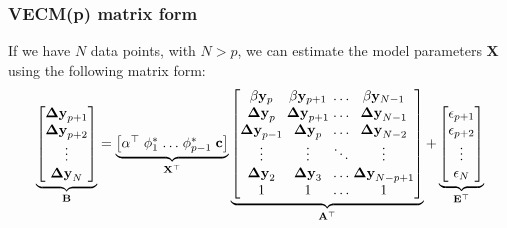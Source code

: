 \documentclass{beamer}
\begin{document}
\appendix

\begin{frame}
\frametitle{VECM(p) matrix form}
If we have $N$ data points, with $N>p$, we can estimate the model parameters $\mathbf{X}$ using the following matrix form:
\small
\begin{equation*}
\underbrace{
      \begin{bmatrix}
       \mathbf{\Delta y}_{p+1}  \\ 
       \mathbf{\Delta y}_{p+2}  \\ 
       \vdots                   \\ 
       \mathbf{\Delta y}_N      
      \end{bmatrix}}_{\mathbf{B} } =
\arraycolsep=1.4pt  
\underbrace{\begin{bmatrix}
   \alpha^\top & \phi^*_1 & \dots & \phi^*_{p-1} &\mathbf{c}   
  \end{bmatrix}}_{\mathbf{X}^\top}
\underbrace{\begin{bmatrix}
 \beta\mathbf{y}_p      & \beta\mathbf{y}_{p+1}   & \dots&   \beta\mathbf{y}_{N-1}   \\
 \mathbf{\Delta y}_{p}   & \mathbf{\Delta y}_{p+1}& \dots &  \mathbf{\Delta y}_{N-1} \\
 \mathbf{\Delta y}_{p-1} & \mathbf{\Delta y}_{p}  & \dots &  \mathbf{\Delta y}_{N-2}   \\
 \vdots                  & \vdots                 & \ddots&  \vdots                   \\
 \mathbf{\Delta y}_{2}   & \mathbf{\Delta y}_{3} & \dots &   \mathbf{\Delta y}_{N-p+1} \\
 1                      & 1                       & \dots     & 1   
 \end{bmatrix}}_{\mathbf{A}^\top}
+
\underbrace{\begin{bmatrix}
              \mathbf{\epsilon}_{p+1} \\ 
              \mathbf{\epsilon}_{p+2} \\ 
              \vdots \\ 
              \mathbf{\epsilon}_N
             \end{bmatrix}}_{\mathbf{E}^\top}
\end{equation*}
\end{frame}
\end{document}

